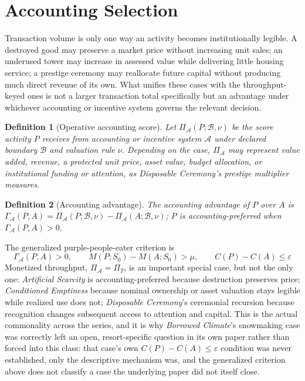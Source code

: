 \documentclass[11pt]{article}
\newtheorem{definition}{Definition}[section]
\begin{document}
\section{Accounting Selection}

Transaction volume is only one way an activity becomes institutionally legible. A destroyed good may preserve a market price without increasing unit sales; an underused tower may increase in assessed value while delivering little housing service; a prestige ceremony may reallocate future capital without producing much direct revenue of its own. What unifies these cases with the throughput-keyed ones is not a larger transaction total specifically but an advantage under whichever accounting or incentive system governs the relevant decision.

\begin{definition}[Operative accounting score]
Let $\Pi_{\mathcal{A}}(P; \mathcal{B}, \nu)$ be the score activity $P$ receives from accounting or incentive system $\mathcal{A}$ under declared boundary $\mathcal{B}$ and valuation rule $\nu$. Depending on the case, $\Pi_{\mathcal{A}}$ may represent value added, revenue, a protected unit price, asset value, budget allocation, or institutional funding or attention, as \emph{Disposable Ceremony}'s prestige multiplier measures.
\end{definition}

\begin{definition}[Accounting advantage]
The accounting advantage of $P$ over $A$ is $\Gamma_{\mathcal{A}}(P, A) = \Pi_{\mathcal{A}}(P; \mathcal{B}, \nu) - \Pi_{\mathcal{A}}(A; \mathcal{B}, \nu)$; $P$ is accounting-preferred when $\Gamma_{\mathcal{A}}(P, A) > 0$.
\end{definition}

The generalized purple-people-eater criterion is
\[
\Gamma_{\mathcal{A}}(P, A) > 0, \qquad M(P; S_0) - M(A; S_0) > \mu, \qquad C(P) - C(A) \leq \varepsilon
\]
Monetized throughput, $\Pi_{\mathcal{A}} = \Pi_T$, is an important special case, but not the only one: \emph{Artificial Scarcity} is accounting-preferred because destruction preserves price; \emph{Conditioned Emptiness} because nominal ownership or asset valuation stays legible while realized use does not; \emph{Disposable Ceremony}'s ceremonial recursion because recognition changes subsequent access to attention and capital. This is the actual commonality across the series, and it is why \emph{Borrowed Climate}'s snowmaking case was correctly left an open, resort-specific question in its own paper rather than forced into this class: that case's own $C(P) - C(A) \leq \varepsilon$ condition was never established, only the descriptive mechanism was, and the generalized criterion above does not classify a case the underlying paper did not itself close.
\end{document}
